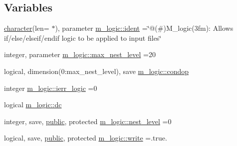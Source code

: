\subsection*{Variables}
\begin{DoxyCompactItemize}
\item 
\hyperlink{option__stopwatch_83_8txt_abd4b21fbbd175834027b5224bfe97e66}{character}(len= $\ast$), parameter \hyperlink{namespacem__logic_aa4a758529f4ba04d66cddf4cd51e0bc1}{m\+\_\+logic\+::ident} =\char`\"{}@(\#)M\+\_\+logic(3fm)\+: Allows if/else/elseif/endif logic to be applied to input files\char`\"{}
\item 
integer, parameter \hyperlink{namespacem__logic_a22ef0b94ebd8b7f3b35a33c8d9250759}{m\+\_\+logic\+::max\+\_\+nest\+\_\+level} =20
\item 
logical, dimension(0\+:max\+\_\+nest\+\_\+level), save \hyperlink{namespacem__logic_ad7573389be889c19d1496dc2e9dff9a1}{m\+\_\+logic\+::condop}
\item 
integer \hyperlink{namespacem__logic_a047a31b5831fda2a9421240f1edce712}{m\+\_\+logic\+::ierr\+\_\+logic} =0
\item 
logical \hyperlink{namespacem__logic_ac3811d1cc267a1241feb5f77905110a2}{m\+\_\+logic\+::dc}
\item 
integer, save, \hyperlink{M__stopwatch_83_8txt_a2f74811300c361e53b430611a7d1769f}{public}, protected \hyperlink{namespacem__logic_aba076b8206140be84ad573bc89c82b14}{m\+\_\+logic\+::nest\+\_\+level} =0
\item 
logical, save, \hyperlink{M__stopwatch_83_8txt_a2f74811300c361e53b430611a7d1769f}{public}, protected \hyperlink{namespacem__logic_a487df89eac953b22a40b143aaf8ff1ea}{m\+\_\+logic\+::write} =.true.
\end{DoxyCompactItemize}
